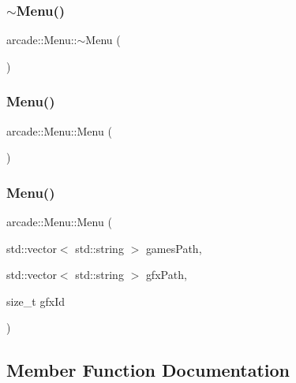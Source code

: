 \subsubsection{\texorpdfstring{$\sim$\+Menu()}{~Menu()}}
{\footnotesize\ttfamily arcade\+::\+Menu\+::$\sim$\+Menu (\begin{DoxyParamCaption}{ }\end{DoxyParamCaption})\hspace{0.3cm}{\ttfamily [virtual]}}

\mbox{\label{classarcade_1_1_menu_a1dab304f5e07c98f6527a0dac57db46b}} 
\subsubsection{\texorpdfstring{Menu()}{Menu()}\hspace{0.1cm}{\footnotesize\ttfamily [1/2]}}
{\footnotesize\ttfamily arcade\+::\+Menu\+::\+Menu (\begin{DoxyParamCaption}{ }\end{DoxyParamCaption})}

\mbox{\label{classarcade_1_1_menu_ab94e3c0b8e8db84a50e9748c02f648ce}} 
\subsubsection{\texorpdfstring{Menu()}{Menu()}\hspace{0.1cm}{\footnotesize\ttfamily [2/2]}}
{\footnotesize\ttfamily arcade\+::\+Menu\+::\+Menu (\begin{DoxyParamCaption}\item[{std\+::vector$<$ std\+::string $>$}]{games\+Path,  }\item[{std\+::vector$<$ std\+::string $>$}]{gfx\+Path,  }\item[{size\+\_\+t}]{gfx\+Id }\end{DoxyParamCaption})}



\subsection{Member Function Documentation}
\mbox{\label{classarcade_1_1_menu_a1a18e92410e231d70277606f5c8bd4e9}} 

